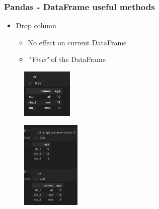 \begin{frame}\frametitle{Pandas - DataFrame useful methods}
   \begin{minipage}{0.58\linewidth}
      \begin{itemize}
         \item Drop column
         \begin{itemize}
            \item No effect on current DataFrame
            \item \textit{"View"} of the DataFrame
         \end{itemize}
      \end{itemize}
      \vspace{.5cm}
      \begin{figure}[H]
         \includegraphics[width=2.4cm]{../images/illustrations/pandas_df_ex.png}
      \end{figure}
   \end{minipage}
   \begin{minipage}{0.38\linewidth}
      \begin{figure}[H]
         \includegraphics[width=2.8cm]{../images/illustrations/pandas_drop_not_saved.png}
      \end{figure}
   \end{minipage}
\end{frame}



